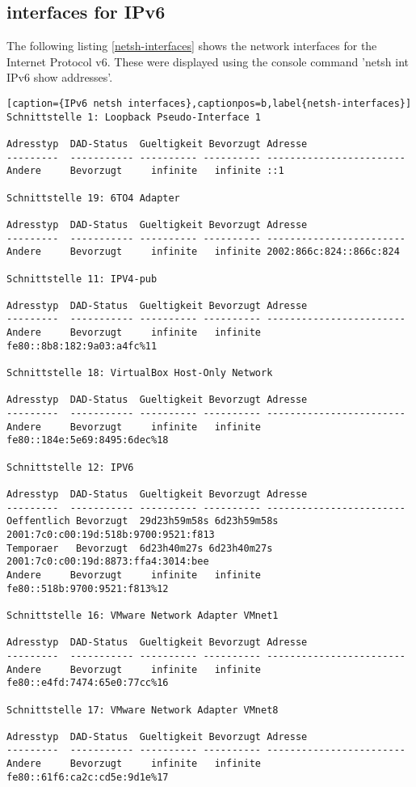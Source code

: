 \subsection{interfaces for IPv6}
The following listing \ref{netsh-interfaces} shows the network interfaces for the Internet Protocol v6. These were displayed using the console command 'netsh int IPv6 show addresses'.
\\
\begin{lstlisting}[caption={IPv6 netsh interfaces},captionpos=b,label{netsh-interfaces}]
Schnittstelle 1: Loopback Pseudo-Interface 1

Adresstyp  DAD-Status  Gueltigkeit Bevorzugt Adresse
---------  ----------- ---------- ---------- ------------------------
Andere     Bevorzugt     infinite   infinite ::1

Schnittstelle 19: 6TO4 Adapter

Adresstyp  DAD-Status  Gueltigkeit Bevorzugt Adresse
---------  ----------- ---------- ---------- ------------------------
Andere     Bevorzugt     infinite   infinite 2002:866c:824::866c:824

Schnittstelle 11: IPV4-pub

Adresstyp  DAD-Status  Gueltigkeit Bevorzugt Adresse
---------  ----------- ---------- ---------- ------------------------
Andere     Bevorzugt     infinite   infinite fe80::8b8:182:9a03:a4fc%11

Schnittstelle 18: VirtualBox Host-Only Network

Adresstyp  DAD-Status  Gueltigkeit Bevorzugt Adresse
---------  ----------- ---------- ---------- ------------------------
Andere     Bevorzugt     infinite   infinite fe80::184e:5e69:8495:6dec%18

Schnittstelle 12: IPV6

Adresstyp  DAD-Status  Gueltigkeit Bevorzugt Adresse
---------  ----------- ---------- ---------- ------------------------
Oeffentlich Bevorzugt  29d23h59m58s 6d23h59m58s 2001:7c0:c00:19d:518b:9700:9521:f813
Temporaer   Bevorzugt  6d23h40m27s 6d23h40m27s 2001:7c0:c00:19d:8873:ffa4:3014:bee
Andere     Bevorzugt     infinite   infinite fe80::518b:9700:9521:f813%12

Schnittstelle 16: VMware Network Adapter VMnet1

Adresstyp  DAD-Status  Gueltigkeit Bevorzugt Adresse
---------  ----------- ---------- ---------- ------------------------
Andere     Bevorzugt     infinite   infinite fe80::e4fd:7474:65e0:77cc%16

Schnittstelle 17: VMware Network Adapter VMnet8

Adresstyp  DAD-Status  Gueltigkeit Bevorzugt Adresse
---------  ----------- ---------- ---------- ------------------------
Andere     Bevorzugt     infinite   infinite fe80::61f6:ca2c:cd5e:9d1e%17


\end{lstlisting}

